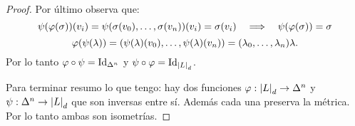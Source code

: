 \begin{proof}
  Por \'ultimo observa que:
  \[
    \psi(\varphi(\sigma))(v_i)=\psi(\sigma(v_0),\ldots,\sigma(v_n))(v_i)=\sigma(v_i) \quad\Longrightarrow\quad
    \psi(\varphi(\sigma))=\sigma
  \]
  \[
    \varphi(\psi(\lambda))=(\psi(\lambda)(v_0),\ldots,\psi(\lambda)(v_n))=(\lambda_0,\ldots,\lambda_n)\lambda.
  \]
  Por lo tanto $\varphi\circ\psi=\text{Id}_{\Delta^n}$ y $\psi\circ\varphi=\text{Id}_{\left| L \right|_d}$.

  Para terminar resumo lo que tengo: hay dos funciones $\varphi:\left| L \right|_d\rightarrow\Delta^n$ y
  $\psi:\Delta^n\rightarrow\left| L \right|_d$ que son inversas entre s\'i. Adem\'as cada una preserva la
  m\'etrica. Por lo tanto ambas son isometr\'ias.  
\end{proof}%

